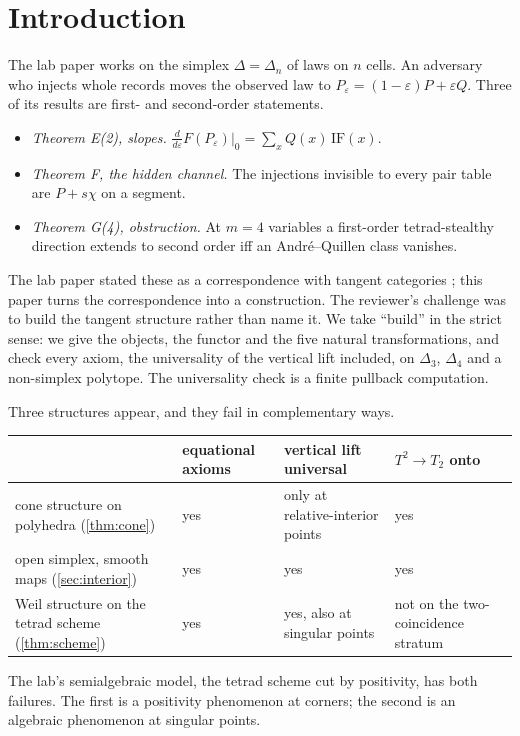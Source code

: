 \documentclass[11pt]{article}
\theoremstyle{definition}\newtheorem{definition}[theorem]{Definition}\newtheorem{remark}[theorem]{Remark}\newtheorem{example}[theorem]{Example}
\begin{document}
\tableofcontents

\section{Introduction}\label{sec:intro}
The lab paper \cite{Lab} works on the simplex $\Delta=\Delta_n$ of laws on $n$ cells. An adversary who injects whole records moves the
observed law to $P_\varepsilon=(1-\varepsilon)P+\varepsilon Q$. Three of its results are first- and second-order statements.
\begin{itemize}
\item \emph{Theorem E(2), slopes.} $\frac{d}{d\varepsilon}F(P_\varepsilon)|_0=\sum_xQ(x)\,\mathrm{IF}(x)$.
\item \emph{Theorem F, the hidden channel.} The injections invisible to every pair table are $P+s\chi$ on a segment.
\item \emph{Theorem G(4), obstruction.} At $m=4$ variables a first-order tetrad-stealthy direction extends to second order iff an
  André--Quillen class vanishes.
\end{itemize}
The lab paper stated these as a correspondence with tangent categories \cite{CockettCruttwell2014}; this paper turns the correspondence
into a construction. The reviewer's challenge was to build the tangent structure rather than name it. We take ``build'' in the strict
sense: we give the objects, the functor and the five natural transformations, and check every axiom, the universality of the vertical
lift included, on $\Delta_3$, $\Delta_4$ and a non-simplex polytope. The universality check is a finite pullback computation.

Three structures appear, and they fail in complementary ways.
\begin{center}\small
\begin{tabular}{p{}p{}p{}p{}}\toprule
& equational axioms & vertical lift universal & $T^2\to T_2$ onto\\\midrule
cone structure on polyhedra (\cref{thm:cone}) & yes & only at relative-interior points & yes\\
open simplex, smooth maps (\cref{sec:interior}) & yes & yes & yes\\
Weil structure on the tetrad scheme (\cref{thm:scheme}) & yes & yes, also at singular points & not on the two-coincidence stratum\\\bottomrule
\end{tabular}
\end{center}
The lab's semialgebraic model, the tetrad scheme cut by positivity, has both failures. The first is a positivity phenomenon at
corners; the second is an algebraic phenomenon at singular points.
\end{document}
